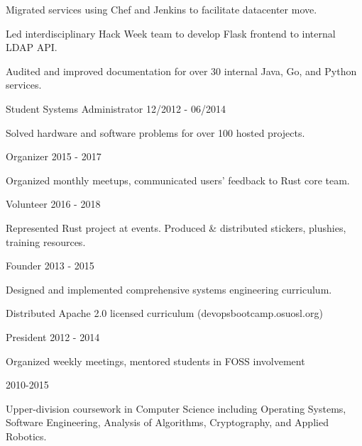 \documentclass[11pt]{article} %
\begin{document}
\begin{description}
Migrated services using Chef and Jenkins to facilitate datacenter move.

Led interdisciplinary Hack Week team to develop Flask frontend to internal
LDAP API.

Audited and improved documentation for over 30 internal Java, Go, and Python
services.

           {Student Systems Administrator}
           {12/2012 - 06/2014}

Solved hardware and software problems for over 100 hosted projects.

% 
% 

\end{description}


\begin{description}
\squish
{}
           {Organizer}
           {2015 - 2017}

Organized monthly meetups, communicated users' feedback to Rust core team.

           {Volunteer}
           {2016 - 2018}

Represented Rust project at events. Produced \& distributed stickers, plushies, training resources.

           {Founder}
           {2013 - 2015}

Designed and implemented comprehensive systems engineering curriculum.

Distributed Apache 2.0 licensed curriculum (devopsbootcamp.osuosl.org)

           {President}
           {2012 - 2014}

Organized weekly meetings, mentored students in FOSS involvement

\end{description}


\begin{description}
\squish
{}
           {}
           {2010-2015}

Upper-division coursework in Computer Science including Operating Systems,\\
Software Engineering, Analysis of Algorithms, Cryptography, and Applied Robotics.

\end{description}
\end{document}
